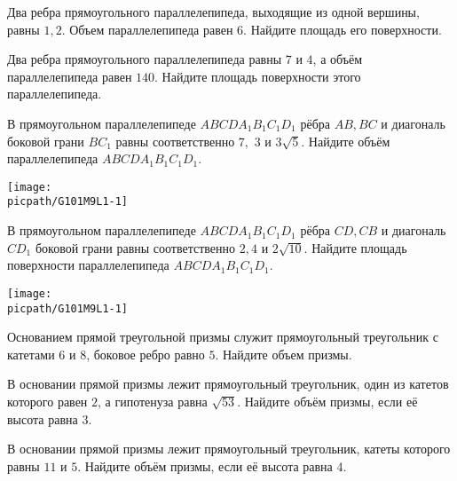 
\begin{class}[number=1]
	\begin{listofex}
		\item Два ребра прямоугольного параллелепипеда, выходящие из одной вершины, равны \(1, 2\). Объем параллелепипеда равен \(6\). Найдите площадь его поверхности.
		\item Два ребра прямоугольного параллелепипеда равны \(7\) и \(4\), а объём параллелепипеда равен \(140\). Найдите площадь поверхности этого параллелепипеда.
		\item 
		\begin{minipage}[t]{\bodywidth}
			В прямоугольном параллелепипеде \(ABCDA_1B_1C_1D_1\) рёбра \(AB, BC\) и диагональ боковой грани \(BC_1\) равны соответственно \(7, \) \( 3\) и \(3\sqrt{5}\). Найдите объём параллелепипеда \(ABCDA_1B_1C_1D_1\).
		\end{minipage}
		\hspace{0.02\linewidth}
		\begin{minipage}[t]{\picwidth}
			\texttt{[image: \\picpath/G101M9L1-1]}
		\end{minipage}
		\item 
		\begin{minipage}[t]{\bodywidth}
			В прямоугольном параллелепипеде \(ABCDA_1B_1C_1D_1\) рёбра \(CD, CB\) и диагональ \(CD_1\) боковой грани равны соответственно \(2, 4\) и \(2\sqrt{10}\). Найдите площадь поверхности параллелепипеда \(ABCDA_1B_1C_1D_1\).
		\end{minipage}
		\hspace{0.02\linewidth}
		\begin{minipage}[t]{\picwidth}
			\texttt{[image: \\picpath/G101M9L1-1]}
		\end{minipage}
		\item Основанием прямой треугольной призмы служит прямоугольный треугольник с катетами \(6\) и \(8\), боковое ребро равно \(5\). Найдите объем призмы.
		\item В основании прямой призмы лежит прямоугольный треугольник, один из катетов которого равен \(2\), а гипотенуза равна \(\sqrt{53}\). Найдите объём призмы, если её высота равна \(3\).
		\item В основании прямой призмы лежит прямоугольный треугольник, катеты которого равны \(11\) и \(5\). Найдите объём призмы, если её высота равна \(4\).
		\item 

\end{listofex}
\end{class}
